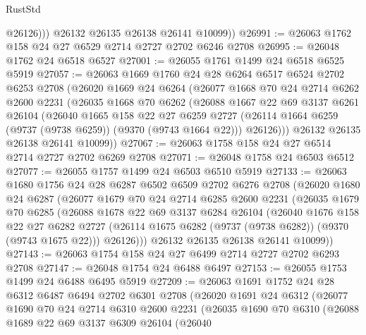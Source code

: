 \begin{lexlean}{RustStd}
\begin{coremodule}
              @26126)))
        @26132
        @26135
        @26138
        @26141
        @10099))
@26991 := @26063 @1762 @158 @24 @27 @6529 @2714 @2727 @2702 @6246 @2708
@26995 := @26048 @1762 @24 @6518 @6527
@27001 := @26055 @1761 @1499 @24 @6518 @6525 @5919
@27057 := @26063
    @1669
    @1760
    @24
    @28
    @6264
    @6517
    @6524
    @2702
    @6253
    @2708
    (@26020
      @1669
      @24
      @6264
      (@26077
        @1668
        @70
        @24
        @2714
        @6262
        @2600
        @2231
        (@26035
          @1668
          @70
          @6262
          (@26088
            @1667
            @22
            @69
            @3137
            @6261
            @26104
            (@26040
              @1665
              @158
              @22
              @27
              @6259
              @2727
              (@26114 @1664 @6259 (@9737 (@9738 @6259)) (@9370 (@9743 @1664 @22)))
              @26126)))
        @26132
        @26135
        @26138
        @26141
        @10099))
@27067 := @26063 @1758 @158 @24 @27 @6514 @2714 @2727 @2702 @6269 @2708
@27071 := @26048 @1758 @24 @6503 @6512
@27077 := @26055 @1757 @1499 @24 @6503 @6510 @5919
@27133 := @26063
    @1680
    @1756
    @24
    @28
    @6287
    @6502
    @6509
    @2702
    @6276
    @2708
    (@26020
      @1680
      @24
      @6287
      (@26077
        @1679
        @70
        @24
        @2714
        @6285
        @2600
        @2231
        (@26035
          @1679
          @70
          @6285
          (@26088
            @1678
            @22
            @69
            @3137
            @6284
            @26104
            (@26040
              @1676
              @158
              @22
              @27
              @6282
              @2727
              (@26114 @1675 @6282 (@9737 (@9738 @6282)) (@9370 (@9743 @1675 @22)))
              @26126)))
        @26132
        @26135
        @26138
        @26141
        @10099))
@27143 := @26063 @1754 @158 @24 @27 @6499 @2714 @2727 @2702 @6293 @2708
@27147 := @26048 @1754 @24 @6488 @6497
@27153 := @26055 @1753 @1499 @24 @6488 @6495 @5919
@27209 := @26063
    @1691
    @1752
    @24
    @28
    @6312
    @6487
    @6494
    @2702
    @6301
    @2708
    (@26020
      @1691
      @24
      @6312
      (@26077
        @1690
        @70
        @24
        @2714
        @6310
        @2600
        @2231
        (@26035
          @1690
          @70
          @6310
          (@26088
            @1689
            @22
            @69
            @3137
            @6309
            @26104
            (@26040

\end{coremodule}
\end{lexlean}

